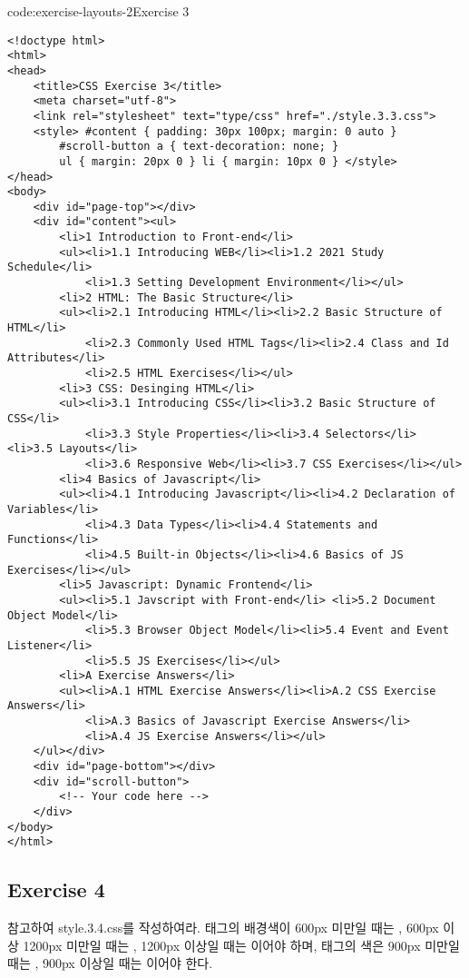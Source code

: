 \begin{codeenv}{code:exercise-layouts-2}{Exercise 3}\begin{verbatim}
<!doctype html>
<html>
<head>
    <title>CSS Exercise 3</title>
    <meta charset="utf-8">
    <link rel="stylesheet" text="type/css" href="./style.3.3.css">
    <style> #content { padding: 30px 100px; margin: 0 auto }
        #scroll-button a { text-decoration: none; }
        ul { margin: 20px 0 } li { margin: 10px 0 } </style>
</head>
<body>
    <div id="page-top"></div>
    <div id="content"><ul>
        <li>1 Introduction to Front-end</li>
        <ul><li>1.1 Introducing WEB</li><li>1.2 2021 Study Schedule</li>
            <li>1.3 Setting Development Environment</li></ul>
        <li>2 HTML: The Basic Structure</li>
        <ul><li>2.1 Introducing HTML</li><li>2.2 Basic Structure of HTML</li>
            <li>2.3 Commonly Used HTML Tags</li><li>2.4 Class and Id Attributes</li>
            <li>2.5 HTML Exercises</li></ul>
        <li>3 CSS: Desinging HTML</li>
        <ul><li>3.1 Introducing CSS</li><li>3.2 Basic Structure of CSS</li>
            <li>3.3 Style Properties</li><li>3.4 Selectors</li> <li>3.5 Layouts</li>
            <li>3.6 Responsive Web</li><li>3.7 CSS Exercises</li></ul>
        <li>4 Basics of Javascript</li>
        <ul><li>4.1 Introducing Javascript</li><li>4.2 Declaration of Variables</li>
            <li>4.3 Data Types</li><li>4.4 Statements and Functions</li>
            <li>4.5 Built-in Objects</li><li>4.6 Basics of JS Exercises</li></ul>
        <li>5 Javascript: Dynamic Frontend</li>
        <ul><li>5.1 Javscript with Front-end</li> <li>5.2 Document Object Model</li>
            <li>5.3 Browser Object Model</li><li>5.4 Event and Event Listener</li>
            <li>5.5 JS Exercises</li></ul>
        <li>A Exercise Answers</li>
        <ul><li>A.1 HTML Exercise Answers</li><li>A.2 CSS Exercise Answers</li>
            <li>A.3 Basics of Javascript Exercise Answers</li>
            <li>A.4 JS Exercise Answers</li></ul>
    </ul></div>
    <div id="page-bottom"></div>
    <div id="scroll-button">
        <!-- Your code here -->
    </div>
</body>
</html>
\end{verbatim}
\end{codeenv}

\subsection*{Exercise 4}
\을 참고하여 style.3.4.css를 작성하여라.  태그의 배경색이 600px 미만일 때는 , 600px 이상 1200px 미만일 때는 , 1200px 이상일 때는 이어야 하며,  태그의 색은 900px 미만일 때는 , 900px 이상일 때는 이어야 한다.

